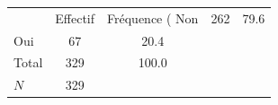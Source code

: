 {
\def\sym#1{\ifmmode^{#1}\else\(^{#1}\)\fi}
\begin{tabular}{l*{1}{cc}}
\toprule
            &    Effectif&Fréquence (%
\midrule
Non         &         262&        79.6\\
Oui         &          67&        20.4\\
Total       &         329&       100.0\\
\midrule
\(N\)       &         329&            \\
\bottomrule
\end{tabular}
}
